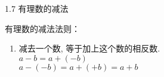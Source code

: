 \begin{frame}[t]{1.7 有理数的减法}
\begin{spacing}{1.5}
\Large
有理数的减法法则：\\
\begin{enumerate}[label={\arabic*.}]
\item 减去一个数, 等于加上这个数的相反数.\\
$ a - b = a + (-b)$ \\
$ a - (-b) = a + (+b) = a + b$ \\
\end{enumerate}
\end{spacing}
\end{frame}